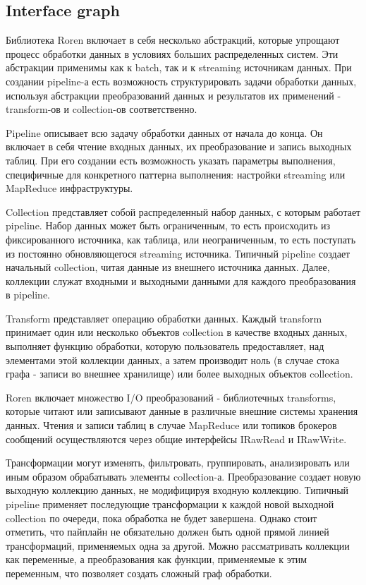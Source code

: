 \subsection{Interface graph}

Библиотека Roren включает в себя несколько абстракций, которые упрощают процесс обработки данных в условиях больших распределенных систем. Эти абстракции применимы как к batch, так и к streaming источникам данных. При создании pipeline-а есть возможность структурировать задачи обработки данных, используя абстракции преобразований данных и результатов их применений - transform-ов и collection-ов соответственно.

Pipeline описывает всю задачу обработки данных от начала до конца. Он включает в себя чтение входных данных, их преобразование и запись выходных таблиц. При его создании есть возможность указать параметры выполнения, специфичные для конкретного паттерна выполнения: настройки streaming или MapReduce инфраструктуры.

Collection представляет собой распределенный набор данных, с которым работает pipeline. Набор данных может быть ограниченным, то есть происходить из фиксированного источника, как таблица, или неограниченным, то есть поступать из постоянно обновляющегося streaming источника. Типичный pipeline создает начальный collection, читая данные из внешнего источника данных. Далее, коллекции служат входными и выходными данными для каждого преобразования в pipeline.

Transform представляет операцию обработки данных. Каждый transform принимает один или несколько объектов collection в качестве входных данных, выполняет функцию обработки, которую пользователь предоставляет, над элементами этой коллекции данных, а затем производит ноль (в случае стока графа - записи во внешнее хранилище) или более выходных объектов collection.

Roren включает множество I/O преобразований - библиотечных transforms, которые читают или записывают данные в различные внешние системы хранения данных. Чтения и записи таблиц в случае MapReduce или топиков брокеров сообщений осуществляются через общие интерфейсы IRawRead и IRawWrite.

Трансформации могут изменять, фильтровать, группировать, анализировать или иным образом обрабатывать элементы collection-а. Преобразование создает новую выходную коллекцию данных, не модифицируя входную коллекцию. Типичный pipeline применяет последующие трансформации к каждой новой выходной collection по очереди, пока обработка не будет завершена. Однако стоит отметить, что пайплайн не обязательно должен быть одной прямой линией трансформаций, применяемых одна за другой. Можно рассматривать коллекции как переменные, а преобразования как функции, применяемые к этим переменным, что позволяет создать сложный граф обработки.

